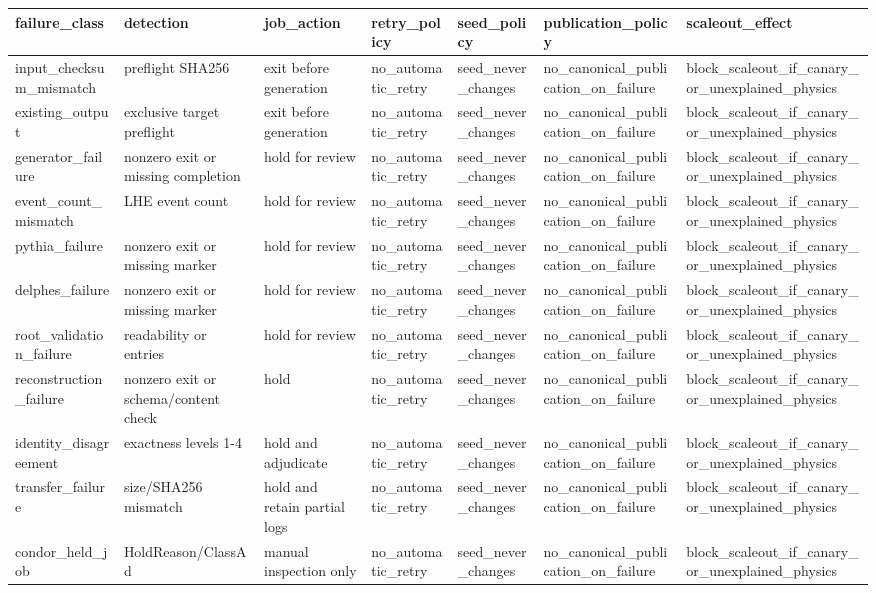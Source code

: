 \begin{tabular}{lllllll}
\toprule
failure\_class & detection & job\_action & retry\_policy & seed\_policy & publication\_policy & scaleout\_effect \\
\midrule
input\_checksum\_mismatch & preflight SHA256 & exit before generation & no\_automatic\_retry & seed\_never\_changes & no\_canonical\_publication\_on\_failure & block\_scaleout\_if\_canary\_or\_unexplained\_physics \\
existing\_output & exclusive target preflight & exit before generation & no\_automatic\_retry & seed\_never\_changes & no\_canonical\_publication\_on\_failure & block\_scaleout\_if\_canary\_or\_unexplained\_physics \\
generator\_failure & nonzero exit or missing completion & hold for review & no\_automatic\_retry & seed\_never\_changes & no\_canonical\_publication\_on\_failure & block\_scaleout\_if\_canary\_or\_unexplained\_physics \\
event\_count\_mismatch & LHE event count & hold for review & no\_automatic\_retry & seed\_never\_changes & no\_canonical\_publication\_on\_failure & block\_scaleout\_if\_canary\_or\_unexplained\_physics \\
pythia\_failure & nonzero exit or missing marker & hold for review & no\_automatic\_retry & seed\_never\_changes & no\_canonical\_publication\_on\_failure & block\_scaleout\_if\_canary\_or\_unexplained\_physics \\
delphes\_failure & nonzero exit or missing marker & hold for review & no\_automatic\_retry & seed\_never\_changes & no\_canonical\_publication\_on\_failure & block\_scaleout\_if\_canary\_or\_unexplained\_physics \\
root\_validation\_failure & readability or entries & hold for review & no\_automatic\_retry & seed\_never\_changes & no\_canonical\_publication\_on\_failure & block\_scaleout\_if\_canary\_or\_unexplained\_physics \\
reconstruction\_failure & nonzero exit or schema/content check & hold & no\_automatic\_retry & seed\_never\_changes & no\_canonical\_publication\_on\_failure & block\_scaleout\_if\_canary\_or\_unexplained\_physics \\
identity\_disagreement & exactness levels 1-4 & hold and adjudicate & no\_automatic\_retry & seed\_never\_changes & no\_canonical\_publication\_on\_failure & block\_scaleout\_if\_canary\_or\_unexplained\_physics \\
transfer\_failure & size/SHA256 mismatch & hold and retain partial logs & no\_automatic\_retry & seed\_never\_changes & no\_canonical\_publication\_on\_failure & block\_scaleout\_if\_canary\_or\_unexplained\_physics \\
condor\_held\_job & HoldReason/ClassAd & manual inspection only & no\_automatic\_retry & seed\_never\_changes & no\_canonical\_publication\_on\_failure & block\_scaleout\_if\_canary\_or\_unexplained\_physics \\
\bottomrule
\end{tabular}
